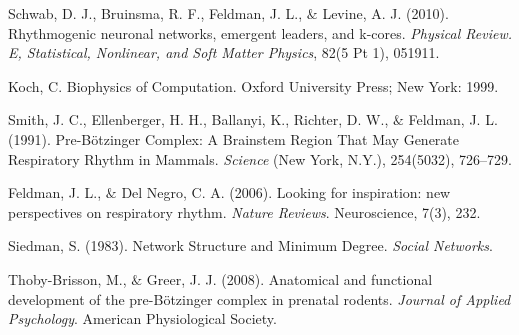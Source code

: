 \documentclass[11pt,letterpaper]{article}
\begin{document}
\begin{thebibliography}{9}
Schwab, D. J., Bruinsma, R. F., Feldman, J. L., $\&$ Levine, A. J. (2010). Rhythmogenic neuronal networks, emergent leaders, and k-cores.
\textit{Physical Review. E, Statistical, Nonlinear, and Soft Matter Physics}, 82(5 Pt 1), 051911.

Koch, C. Biophysics of Computation. Oxford University Press; New York: 1999.

Smith, J. C., Ellenberger, H. H., Ballanyi, K., Richter, D. W., $\&$ Feldman, J. L. (1991). Pre-Bötzinger Complex: A Brainstem Region That May Generate Respiratory Rhythm in Mammals. \textit{Science} (New York, N.Y.), 254(5032), 726–729.

Feldman, J. L., $\&$ Del Negro, C. A. (2006). Looking for inspiration: new perspectives on respiratory rhythm. \textit{Nature Reviews}. Neuroscience, 7(3), 232.

Siedman, S. (1983). Network Structure and Minimum Degree. \textit{Social Networks}.

Thoby-Brisson, M., $\&$ Greer, J. J. (2008). Anatomical and functional development of the pre-Bötzinger complex in prenatal rodents. \textit{Journal of Applied Psychology}. American Physiological Society.

\end{thebibliography}
\newpage
\end{document}
